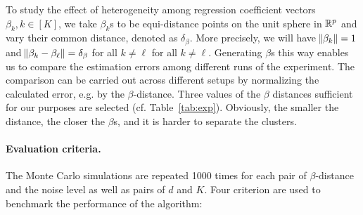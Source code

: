 \documentclass[12pt]{article}
\begin{document}
	To study the effect of heterogeneity among regression coefficient vectors $\beta_k, k \in [K]$, we take  $\beta_k$s to be equi-distance points on the unit sphere in $\mathbb{R}^p$ and vary their common distance, denoted as $\delta_\beta$. More precisely, we will have $\norm{\beta_k} = 1$  and  $\norm{\beta_k - \beta_\ell} = \delta_\beta$ for all $k \neq \ell$ for all $k \neq \ell$.   Generating $\beta$s this way enables us to compare the estimation errors among different runs of the experiment. The comparison can be carried out across different setups by normalizing the calculated error, e.g. by the $\beta$-distance.
	Three values of the $\beta$ distances  sufficient for our purposes are selected (cf. Table~\ref{tab:exp}). Obviously, the smaller the distance, the closer the $\beta$s, and it is harder to separate the clusters.
	



\paragraph{Evaluation criteria.}
The Monte Carlo simulations are repeated 1000 times for each pair of $\beta$-distance and  the noise level as well as pairs of $d$ and $K$. Four criterion are used to benchmark the performance of the algorithm: 
\end{document}
